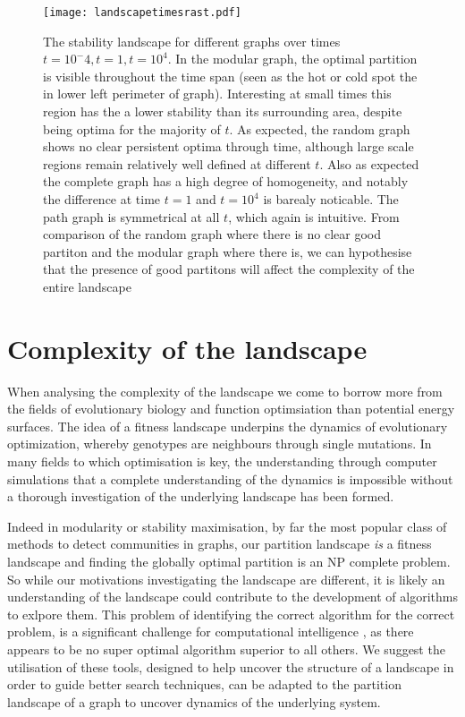 \begin{figure}[h]
  \centering
  \texttt{[image: landscapetimesrast.pdf]}
  \caption[The evolution of the stability landscape over time]%
  {The stability landscape for different graphs over times $t=10^-4, t=1, t=10^4$.  In the modular graph, the optimal partition is visible throughout the time span (seen as the hot or cold spot the in lower left perimeter of graph).  Interesting at small times this region has the a lower stability than its surrounding area, despite being optima for the majority of $t$.   As expected, the random graph shows no clear persistent optima through time, although large scale regions remain relatively well defined at different $t$.  Also as expected the complete graph has a high degree of homogeneity, and notably the difference at time $t=1$ and $t=10^4$ is barealy noticable.  The path graph is symmetrical at all $t$, which again is intuitive.  From comparison of the random graph where there is no clear good partiton and the modular graph where there is, we can hypothesise that the presence of good partitons will affect the complexity of the entire landscape}\label{fig:landscapetimes}
\end{figure}

\clearpage
\section{Complexity of the landscape}
\label{sec:landscapeComplexity}

When analysing the complexity of the landscape we come to borrow more from the fields of evolutionary biology and function optimsiation than potential energy surfaces. The idea of a fitness landscape underpins the dynamics of evolutionary optimization, whereby genotypes are neighbours through single mutations.  In many fields to which optimisation is key, the understanding through computer simulations that a complete understanding of the dynamics is impossible without a thorough investigation of the underlying landscape has been formed.

Indeed in modularity or stability maximisation, by far the most popular class of methods to detect communities in graphs, our partition landscape \textit{is} a fitness landscape and finding the globally optimal partition is an NP complete problem.  So while our motivations investigating the landscape are different, it is likely an understanding of the landscape could contribute to the development of algorithms to exlpore them.  This problem of identifying the correct algorithm for the correct problem, is a significant challenge for computational intelligence \cite{Fortunato}, as there appears to be no super optimal algorithm superior to all others.  We suggest the utilisation of these tools, designed to help uncover the structure of a landscape in order to guide better search techniques, can be adapted to the partition landscape of a graph to uncover dynamics of the underlying system.

